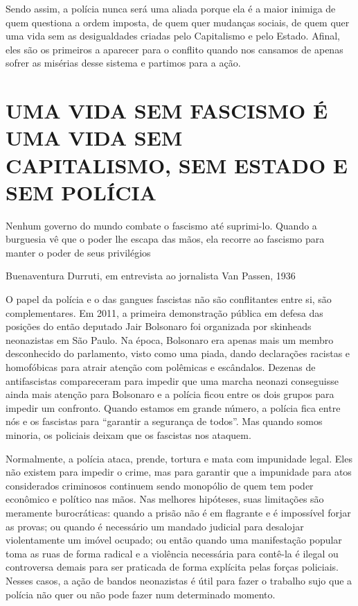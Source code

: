 Sendo assim, a polícia nunca será uma aliada porque ela é a maior inimiga de quem questiona a ordem imposta, de quem quer mudanças sociais, de quem quer uma vida sem as desigualdades criadas pelo Capitalismo e pelo Estado. Afinal, eles são os primeiros a aparecer para o conflito quando nos cansamos de apenas sofrer as misérias desse sistema e partimos para a ação.

\section{UMA VIDA SEM FASCISMO É UMA VIDA SEM CAPITALISMO, SEM ESTADO E SEM POLÍCIA}

\epigraph{Nenhum governo do mundo combate o fascismo até suprimi-lo. Quando a burguesia vê que o poder lhe escapa das mãos, ela recorre ao fascismo para manter o poder de seus privilégios}{Buenaventura Durruti, em entrevista ao jornalista Van Passen, 1936}

O papel da polícia e o das gangues fascistas não são conflitantes entre si, são complementares. Em 2011, a primeira demonstração pública em defesa das posições do então deputado Jair Bolsonaro foi organizada por skinheads neonazistas em São Paulo. Na época, Bolsonaro era apenas mais um membro desconhecido do parlamento, visto como uma piada, dando declarações racistas e homofóbicas para atrair atenção com polêmicas e escândalos. Dezenas de antifascistas compareceram para impedir que uma marcha neonazi conseguisse ainda mais atenção para Bolsonaro e a polícia ficou entre os dois grupos para impedir um confronto. Quando estamos em grande número, a polícia fica entre nós e os fascistas para “garantir a segurança de todos”. Mas quando somos minoria, os policiais deixam que os fascistas nos ataquem.

Normalmente, a polícia ataca, prende, tortura e mata com impunidade legal. Eles não existem para impedir o crime, mas para garantir que a impunidade para atos considerados criminosos continuem sendo monopólio de quem tem poder econômico e político nas mãos. Nas melhores hipóteses, suas limitações são meramente burocráticas: quando a prisão não é em flagrante e é impossível forjar as provas; ou quando é necessário um mandado judicial para desalojar violentamente um imóvel ocupado; ou então quando uma manifestação popular toma as ruas de forma radical e a violência necessária para contê-la é ilegal ou controversa demais para ser praticada de forma explícita pelas forças policiais. Nesses casos, a ação de bandos neonazistas é útil para fazer o trabalho sujo que a polícia não quer ou não pode fazer num determinado momento.

